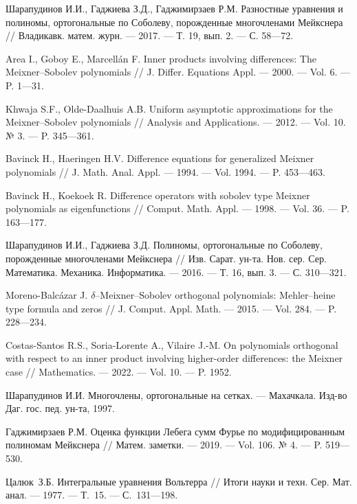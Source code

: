\begin{thebibliography}{111}
{Шарапудинов И.И., Гаджиева З.Д., Гаджимирзаев Р.М.}
Разностные уравнения и полиномы, ортогональные по Соболеву, порожденные многочленами Мейкснера
//
Владикавк. матем. журн.
--- 2017.
--- Т. 19, вып. 2.
--- С. 58---72.

{Area I., Goboy E., Marcell\'an F.}
Inner products involving differences: The Meixner--Sobolev polynomials
//
J. Differ. Equations Appl.
--- 2000.
--- Vol. 6.
--- P. 1---31.

{Khwaja S.F., Olde-Daalhuis A.B.}
Uniform asymptotic approximations for the Meixner--Sobolev polynomials
//
Analysis and Applications.
--- 2012.
--- Vol. 10. № 3.
--- P. 345---361.

{Bavinck H., Haeringen H.V.}
Difference equations for generalized Meixner polynomials
//
J. Math. Anal. Appl.
--- 1994.
--- Vol. 1994.
--- P. 453---463.

{Bavinck H., Koekoek R.}
Difference operators with sobolev type Meixner polynomials as eigenfunctions
//
Comput. Math. Appl.
--- 1998.
--- Vol. 36.
--- P. 163---177.

{Шарапудинов И.И., Гаджиева З.Д.}
Полиномы, ортогональные по Соболеву, порожденные многочленами Мейкснера
//
Изв. Сарат. ун-та. Нов. сер. Сер. Математика. Механика. Информатика.
--- 2016.
--- Т. 16, вып. 3.
--- С. 310---321.

{Moreno-Balc\'azar J.}
$\delta$--Meixner--Sobolev orthogonal polynomials: Mehler--heine type formula and zeros
//
J. Comput. Appl. Math.
--- 2015.
--- Vol. 284.
--- P. 228---234.

{Costas-Santos R.S., Soria-Lorente A., Vilaire J.-M.}
On polynomials orthogonal with respect to an inner product involving higher-order differences: the Meixner case
//
Mathematics.
--- 2022.
--- Vol. 10.
--- P. 1952.

{Шарапудинов И.И.}
Многочлены, ортогональные на сетках.
--- Махачкала. Изд-во Даг. гос. пед. ун-та, 1997.

{Гаджимирзаев Р.М.}
Оценка функции Лебега сумм Фурье по модифицированным полиномам Мейкснера
//
Матем. заметки.
--- 2019.
--- Vol. 106. № 4.
--- P. 519---530.



Цалюк~З.Б.
Интегральные уравнения Вольтерра
//
Итоги науки и техн. Сер. Мат. анал.
--- 1977.
--- Т.~15.
--- С.~131---198.


\end{thebibliography}
